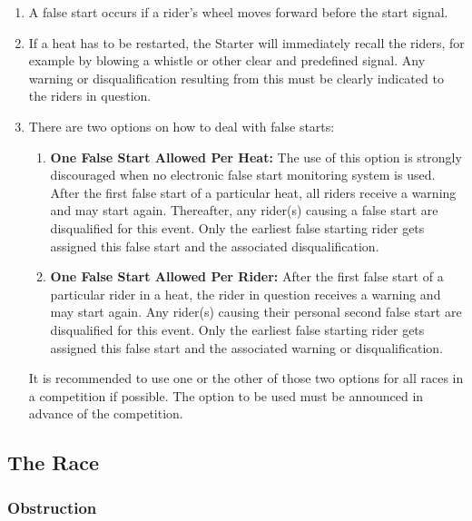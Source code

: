 \begin{enumerate}[leftmargin=1.5em,labelsep=*]
	\item A false start occurs if a rider's wheel moves forward before the start signal.
	
	\item If a heat has to be restarted, the Starter will immediately recall the riders, for example by blowing a 
  whistle or other clear and predefined signal.
	Any warning or disqualification resulting from this must be clearly indicated to the riders in question.
	
	\item There are two options on how to deal with false starts:
	\begin{enumerate}[label*=\arabic*,leftmargin=1.5em,labelsep=*]
		\item \textbf{One False Start Allowed Per Heat:}
		The use of this option is strongly discouraged when no electronic false start monitoring system is used.
		After the first false start of a particular heat, all riders receive a warning and may start again.
		Thereafter, any rider(s) causing a false start are disqualified for this event.
		Only the earliest false starting rider gets assigned this false start and the associated disqualification.
		
		\item \textbf{One False Start Allowed Per Rider:}
		After the first false start of a particular rider in a heat, the rider in question receives a warning and may start again.
		Any rider(s) causing their personal second false start are disqualified for this event.
		Only the earliest false starting rider gets assigned this false start and the associated warning or disqualification.
	\end{enumerate}
	It is recommended to use one or the other of those two options for all races in a competition if possible. 
  The option to be used must be announced in advance of the competition.
\end{enumerate}

\subsection{The Race \label{subsec:track_racing_race}}

\subsubsection{Obstruction}

